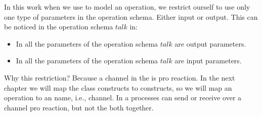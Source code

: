 In this work when we use \oz{} to model an operation, we restrict ourself to use only one type of parameters in the operation schema. Either input or output. This can be noticed in the operation schema $talk$ in:
\begin{itemize}
\item In  all the parameters of the operation schema $talk$ are output parameters.
\item In   all the parameters of the operation schema $talk$ are input parameters.
\end{itemize}
Why this restriction? Because a channel in the \picalc{} is  pro reaction. In the next chapter we will map the \oz{} class constructs to  \picalc{} constructs, so we will map an \oz{} operation to an \picalc{} name, i.e., channel. In \picalc{} a processes can send or receive over a channel pro reaction, but not the both together.